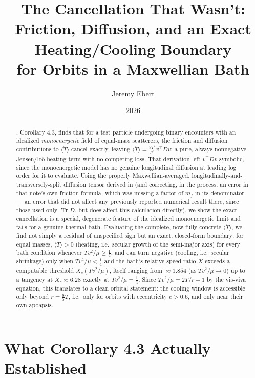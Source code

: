 \documentclass[12pt]{amsart}
\title[The Cancellation That Wasn't]{The Cancellation That Wasn't:\\
Friction, Diffusion, and an Exact Heating/Cooling Boundary\\
for Orbits in a Maxwellian Bath}
\author{Jeremy Ebert}
\date{2026}
\theoremstyle{plain}
\theoremstyle{remark}
\begin{document}
\maketitle

\begin{abstract}
\cite{Ebert2026Bath}, Corollary 4.3, finds that for a test particle undergoing binary encounters with an idealized \emph{monoenergetic} field of equal-mass scatterers, the friction and diffusion contributions to $\langle\dot T\rangle$ cancel exactly, leaving $\langle\dot T\rangle=\tfrac{8T^3}{\mu^2}v^\top Dv$: a pure, always-nonnegative Jensen/It\^o heating term with no competing loss. That derivation left $v^\top Dv$ symbolic, since the monoenergetic model has no genuine longitudinal diffusion at leading log order for it to evaluate. Using the properly Maxwellian-averaged, longitudinally-and-transversely-split diffusion tensor derived in \cite{Ebert2026Rosenbluth} (and correcting, in the process, an error in that note's own friction formula, which was missing a factor of $m_f$ in its denominator --- an error that did not affect any previously reported numerical result there, since those used only $\operatorname{Tr}D$, but does affect this calculation directly), we show the exact cancellation is a special, degenerate feature of the idealized monoenergetic limit and fails for a genuine thermal bath. Evaluating the complete, now fully concrete $\langle\dot T\rangle$, we find not simply a residual of unspecified sign but an exact, closed-form boundary: for equal masses, $\langle\dot T\rangle>0$ (heating, i.e.\ secular growth of the semi-major axis) for every bath condition whenever $Tv^2/\mu\geq\tfrac14$, and can turn negative (cooling, i.e.\ secular shrinkage) only when $Tv^2/\mu<\tfrac14$ and the bath's relative speed ratio $X$ exceeds a computable threshold $X_c(Tv^2/\mu)$, itself ranging from $\approx1.854$ (as $Tv^2/\mu\to0$) up to a tangency at $X_c\approx6.28$ exactly at $Tv^2/\mu=\tfrac14$. Since $Tv^2/\mu=2T/r-1$ by the vis-viva equation, this translates to a clean orbital statement: the cooling window is accessible only beyond $r=\tfrac85T$, i.e.\ only for orbits with eccentricity $e>0.6$, and only near their own apoapsis.
\end{abstract}

\section{What Corollary 4.3 Actually Established}
\end{document}
